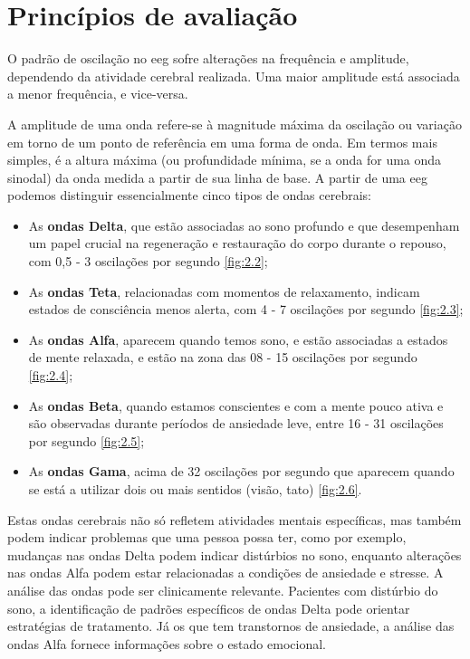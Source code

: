 \documentclass{report}
\begin{document}
\section{Princípios de avaliação}

O padrão de oscilação no \ac{eeg} sofre alterações na frequência e amplitude, dependendo da atividade cerebral realizada. Uma maior amplitude está associada a menor frequência, e vice-versa. 

A amplitude de uma onda refere-se à magnitude máxima da oscilação ou variação em torno de um ponto de referência em uma forma de onda. Em termos mais simples, é a altura máxima (ou profundidade mínima, se a onda for uma onda sinodal) da onda medida a partir de sua linha de base. 
A partir de uma \ac{eeg} podemos distinguir essencialmente cinco tipos de ondas cerebrais:
\begin{itemize}
    \item As \textbf{ondas Delta}, que estão associadas ao sono profundo e que desempenham um papel crucial na regeneração e restauração do corpo durante o repouso, com 0,5 - 3 oscilações por segundo \ref{fig:2.2};
    \item As \textbf{ondas Teta}, relacionadas com momentos de relaxamento, indicam estados de consciência menos alerta, com 4 - 7 oscilações por segundo \ref{fig:2.3};
    \item As \textbf{ondas Alfa}, aparecem quando temos sono, e estão associadas a estados de mente relaxada, e estão na zona das 08 - 15 oscilações por segundo \ref{fig:2.4};
    \item As \textbf{ondas Beta}, quando estamos conscientes e com a mente pouco ativa e são observadas durante períodos de ansiedade leve, entre 16 - 31 oscilações por segundo \ref{fig:2.5}; 
    \item As \textbf{ondas Gama}, acima de 32 oscilações por segundo que aparecem quando se está a utilizar dois ou mais sentidos (visão, tato) \ref{fig:2.6}. 
\end{itemize}

Estas ondas cerebrais não só refletem atividades mentais específicas, mas também podem indicar problemas que uma pessoa possa ter, como por exemplo, mudanças nas ondas Delta podem indicar distúrbios no sono, enquanto alterações nas ondas Alfa podem estar relacionadas a condições de ansiedade e stresse. A análise das ondas pode ser clinicamente relevante. Pacientes com distúrbio do sono, a identificação de padrões específicos de ondas Delta pode orientar estratégias de tratamento. Já os que tem transtornos de ansiedade, a análise das ondas Alfa fornece informações sobre o estado emocional.
\end{document}
